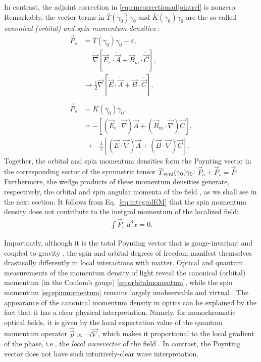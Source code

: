 \documentclass[1p,sort&compress]{elsarticle}
\numberwithin{equation}{section}
\newcommand{\rv}[1]{\vec{#1}}
\begin{document}
In contrast, the adjoint correction in \eqref{eq:emcorrectionadjointrel} is nonzero. Remarkably, the vector terms in $\overline{T}(\gamma_0)\gamma_0$ and $\overline{K}(\gamma_0)\gamma_0$ are the so-called \emph{canonical (orbital) and spin momentum densities} \cite{Berry2009,Bekshaev2011,Bliokh2012,Bliokh2013,Bliokh2013b}:
\begin{align}\label{eq:orbitalmomentum}
  \rv{P}_o &= \overline{T}(\gamma_0)\gamma_0 - \varepsilon, \\
  &= \dot{\rv{\nabla}}[\rv{E}_e\cdot\dot{\rv{A}} + \rv{B}_m\cdot\dot{\rv{C}}], \nonumber\\
&\to \frac{1}{2}\dot{\rv{\nabla}}[\rv{E}\cdot\dot{\rv{A}} + \rv{B}\cdot\dot{\rv{C}}], \nonumber \\ \nonumber\\
\label{eq:spinmomentum}
  \rv{P}_s &= \overline{K}(\gamma_0)\gamma_0, \\
  &= -[(\rv{E}_e\cdot\rv{\nabla})\rv{A} + (\rv{B}_m\cdot\rv{\nabla})\rv{C}], \nonumber\\
&\to -\frac{1}{2}[(\rv{E}\cdot\rv{\nabla})\rv{A} + (\rv{B}\cdot\rv{\nabla})\rv{C}]. \nonumber
\end{align}
Together, the orbital and spin momentum densities form the Poynting vector in the corresponding sector of the symmetric tensor $\overline{T}_{\rm sym}(\gamma_0)\gamma_0$: $\rv{P}_o + \rv{P}_s = \rv{P}$. Furthermore, the wedge products of these momentum densities generate, respectively, the orbital and spin angular momenta of the field \cite{Bekshaev2011,Bliokh2013,Bliokh2013b,Ohanian1986,Mita2000,Soper1976}, as we shall see in the next section. 
It follows from Eq.~\eqref{eq:integralEM} that the spin momentum density does not contribute to the inetgral momentum of the localized field:
\begin{align}
\int \vec{P}_s \; d^3x = 0.
\end{align}

Importantly, although it is the total Poynting vector that is gauge-invariant and coupled to gravity \cite{Soper1976}, the spin and orbital degrees of freedom manifest themselves drastically differently in local interactions with matter. Optical and quantum measurements of the momentum density of light reveal the canonical (orbital) momentum (in the Coulomb gauge) \eqref{eq:orbitalmomentum}, while the spin momentum \eqref{eq:spinmomentum} remains largely unobservable and virtual \cite{Bliokh2013,Bliokh2013a,Bliokh2013b,Bliokh2013c}. 
The appearance of the canonical momentum density in optics can be explained by the fact that it has a clear physical interpretation. Namely, for monochromatic optical fields, it is given by the local expectation value of the quantum momentum operator $\hat{\rv{p}} \propto -i\rv{\nabla}$, which makes it proportional to the local gradient of the phase, i.e., the \emph{local wavevector} of the field \cite{Berry2009,Bliokh2013a}. In contrast, the Poynting vector does not have such intuitively-clear wave interpretation.
\end{document}
